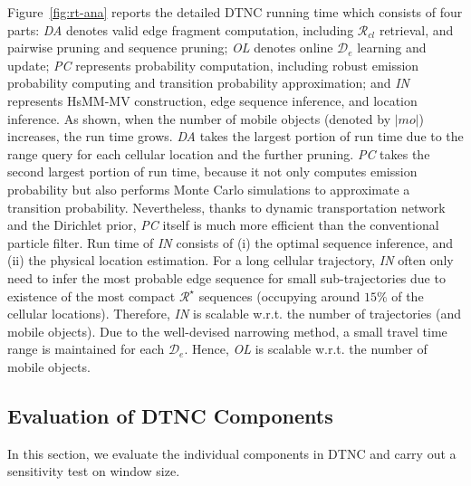 \documentclass{vldb}
\begin{document}
	Figure~\ref{fig:rt-ana} reports the detailed DTNC running time which consists of four parts:
	\textit{DA} denotes valid edge fragment computation, including $\mathcal{R}_{cl}$ retrieval, and pairwise pruning and sequence pruning;
	\textit{OL} denotes online $\mathcal{D}_e$ learning and update;
	\textit{PC} represents probability computation, including robust emission probability computing and transition probability approximation; and \textit{IN} represents HsMM-MV construction, edge sequence inference, and location inference.
	As shown, when the number of mobile objects (denoted by $|mo|$) increases, the run time grows.
	\textit{DA} takes the largest portion of run time due to the range query for each cellular location
	and the further pruning.
	\textit{PC} takes the second largest portion of run time, because it not only computes emission probability but also performs Monte Carlo simulations to approximate a transition probability.
	Nevertheless, thanks to dynamic transportation network and the Dirichlet prior, \textit{PC} itself is much more efficient than the conventional particle filter.
	Run time of \textit{IN} consists of (i) the optimal sequence inference, and (ii) the physical location estimation.
	For a long cellular trajectory, \textit{IN} often only need to infer the most probable edge sequence for small sub-trajectories due to existence of the most compact $\mathcal{R}^\star$ sequences (occupying around $15\%$ of the cellular locations).
	Therefore, \textit{IN} is scalable w.r.t. the number of trajectories (and mobile objects).
	Due to the well-devised narrowing method, a small travel time range is maintained for each $\mathcal{D}_e$. Hence, \textit{OL} is scalable w.r.t. the number of mobile objects.
	
	\vspace{-5pt}
	\subsection{Evaluation of DTNC Components}
	
	In this section, we evaluate the individual components in DTNC and carry out a sensitivity test on window size. 
	
\end{document}
